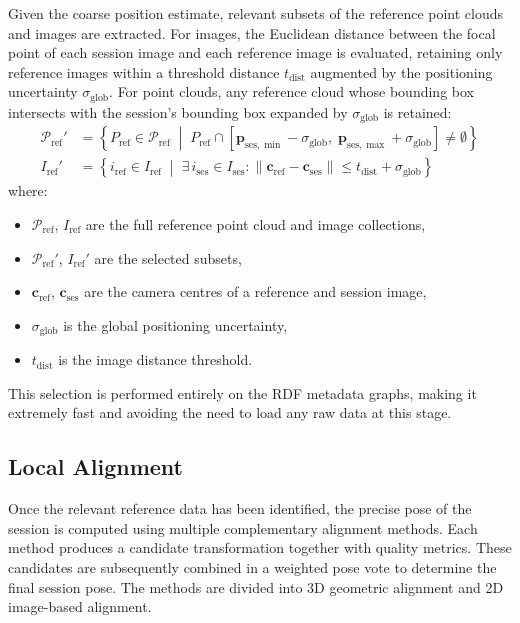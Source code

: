 Given the coarse position estimate, relevant subsets of the reference point clouds and images are extracted. For images, the Euclidean distance between the focal point of each session image and each reference image is evaluated, retaining only reference images within a threshold distance $t_\text{dist}$ augmented by the positioning uncertainty $\sigma_\text{glob}$. For point clouds, any reference cloud whose bounding box intersects with the session's bounding box expanded by $\sigma_\text{glob}$ is retained:
\begin{equation}
\label{eq:4_global_selection}
\begin{split}
\mathcal{P}_\text{ref}' &= \left\{ P_\text{ref} \in \mathcal{P}_\text{ref} \;\middle|\; P_\text{ref} \cap \left[\mathbf{p}_{\text{ses},\min} - \sigma_\text{glob},\; \mathbf{p}_{\text{ses},\max} + \sigma_\text{glob}\right] \neq \emptyset \right\} \\
I_\text{ref}' &= \left\{ i_\text{ref} \in I_\text{ref} \;\middle|\; \exists\, i_\text{ses} \in I_\text{ses} : \|\mathbf{c}_\text{ref} - \mathbf{c}_\text{ses}\| \leq t_\text{dist} + \sigma_\text{glob} \right\}
\end{split}
\end{equation}
where:
\begin{itemize}
    \item $\mathcal{P}_\text{ref}$, $I_\text{ref}$ are the full reference point cloud and image collections,
    \item $\mathcal{P}_\text{ref}'$, $I_\text{ref}'$ are the selected subsets,
    \item $\mathbf{c}_\text{ref}$, $\mathbf{c}_\text{ses}$ are the camera centres of a reference and session image,
    \item $\sigma_\text{glob}$ is the global positioning uncertainty,
    \item $t_\text{dist}$ is the image distance threshold.
\end{itemize}
This selection is performed entirely on the RDF metadata graphs, making it extremely fast and avoiding the need to load any raw data at this stage.

\subsection{Local Alignment}
\label{sec:4_local}

Once the relevant reference data has been identified, the precise pose of the session is computed using multiple complementary alignment methods. Each method produces a candidate transformation together with quality metrics. These candidates are subsequently combined in a weighted pose vote to determine the final session pose. The methods are divided into 3D geometric alignment and 2D image-based alignment.

